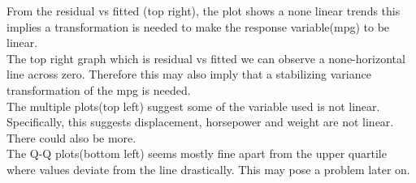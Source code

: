 \documentclass[11pt]{article} %
\begin{document}
From the residual vs fitted (top right), the plot shows a none linear trends this implies a transformation is needed to make the response variable(mpg) to be linear.\\
The top right graph which is residual vs fitted we can observe a none-horizontal line across zero. Therefore this may also imply that a stabilizing variance transformation of the mpg is needed.\\
The multiple plots(top left) suggest some of the variable used is not linear. Specifically, this suggests displacement, horsepower and weight are not linear. There could also be more.\\
The Q-Q plots(bottom left) seems mostly fine apart from the upper quartile where values deviate from the line drastically. This may pose a problem later on.
\end{document}
